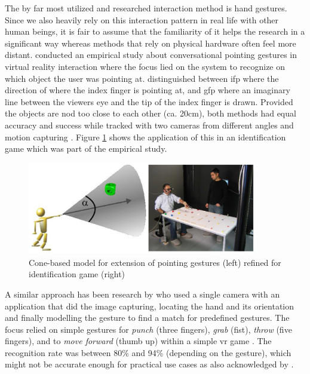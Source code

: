The by far most utilized and researched interaction method is hand gestures. Since we also heavily rely on this interaction pattern in real life with other human beings, it is fair to assume that the familiarity of it helps the research in a significant way whereas methods that rely on physical hardware often feel more distant. \newline
\cite{Pfeiffer2008} conducted an empirical study about conversational pointing gestures in virtual reality interaction where the focus lied on the system to recognize on which object the user was pointing at. \cite{Pfeiffer2008} distinguished between \gls{ifp} where the direction of where the index finger is pointing at, and \gls{gfp} where an imaginary line between the viewers eye and the tip of the index finger is drawn. Provided the objects are nod too close to each other (ca. 20cm), both methods had equal accuracy and success while tracked with two cameras from different angles and motion capturing \citep{Pfeiffer2008}. Figure \ref{fig:pointinggesture} shows the application of this in an identification game which was part of the empirical study.
\begin{figure}[h]
	\begin{center}
		\includegraphics[width=10cm]{03_Figures/05_LitReview/Pfeiffer2008_Pointing.png}
		\caption[Cone-based model for extension of pointing gestures refined for identification game]{Cone-based model for extension of pointing gestures (left) refined for identification game (right) \citep{Pfeiffer2008}}
		\label{fig:pointinggesture}
	\end{center}
\end{figure}
\newline
A similar approach has been research by \cite{Rautaray2011} who used a single camera with an application that did the image capturing, locating the hand and its orientation and finally modelling the gesture to find a match for predefined gestures. The focus relied on simple gestures for \textit{punch} (three fingers), \textit{grab} (fist), \textit{throw} (five fingers), and to \textit{move forward} (thumb up) within a simple \gls{vr} game \citep{Rautaray2011}. The recognition rate was between 80\% and 94\% (depending on the gesture), which might not be accurate enough for practical use cases as also acknowledged by \cite{Rautaray2011}. \newline

